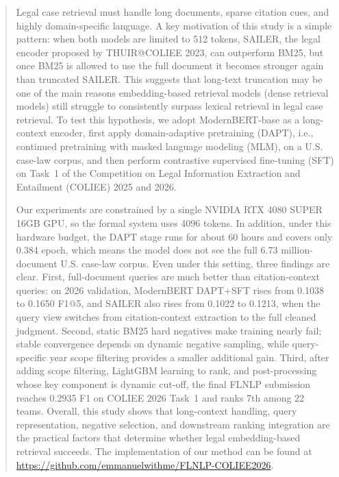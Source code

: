 \begin{abstract}
Legal case retrieval must handle long documents, sparse citation cues, and highly domain-specific language. A key motivation of this study is a simple pattern: when both models are limited to 512 tokens, SAILER, the legal encoder proposed by THUIR@COLIEE 2023, can outperform BM25, but once BM25 is allowed to use the full document it becomes stronger again than truncated SAILER. This suggests that long-text truncation may be one of the main reasons embedding-based retrieval models (dense retrieval models) still struggle to consistently surpass lexical retrieval in legal case retrieval. To test this hypothesis, we adopt ModernBERT-base as a long-context encoder, first apply domain-adaptive pretraining (DAPT), i.e., continued pretraining with masked language modeling (MLM), on a U.S. case-law corpus, and then perform contrastive supervised fine-tuning (SFT) on Task~1 of the Competition on Legal Information Extraction and Entailment (COLIEE) 2025 and 2026.

Our experiments are constrained by a single NVIDIA RTX 4080 SUPER 16GB GPU, so the formal system uses 4096 tokens. In addition, under this hardware budget, the DAPT stage runs for about 60 hours and covers only 0.384 epoch, which means the model does not see the full 6.73 million-document U.S. case-law corpus. Even under this setting, three findings are clear. First, full-document queries are much better than citation-context queries: on 2026 validation, ModernBERT DAPT+SFT rises from 0.1038 to 0.1650 F1@5, and SAILER also rises from 0.1022 to 0.1213, when the query view switches from citation-context extraction to the full cleaned judgment. Second, static BM25 hard negatives make training nearly fail; stable convergence depends on dynamic negative sampling, while query-specific year scope filtering provides a smaller additional gain. Third, after adding scope filtering, LightGBM learning to rank, and post-processing whose key component is dynamic cut-off, the final FLNLP submission reaches 0.2935 F1 on COLIEE 2026 Task~1 and ranks 7th among 22 teams. Overall, this study shows that long-context handling, query representation, negative selection, and downstream ranking integration are the practical factors that determine whether legal embedding-based retrieval succeeds. The implementation of our method can be found at \url{https://github.com/emmanuelwithme/FLNLP-COLIEE2026}.
\end{abstract}

